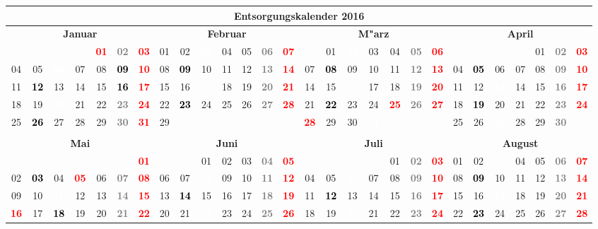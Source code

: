 \documentclass[10pt,a4paper,landscape]{article}
\newcommand{\gb}[1]{\cellcolor{SpringGreen}\textcolor{black}{\bf #1}}
\newcommand{\yb}[1]{\cellcolor{yellow}\textcolor{black}{\bf #1}}
\newcommand{\iv}[1]{\cellcolor{black}\textcolor{white}{\bf #1}}
\newcommand{\rb}[1]{\textbf{\textcolor{red}{#1}}}
\newcommand{\hv}[1]{\textbf{\textcolor{Gray}{#1}}}
\begin{document}
\begin{tabular}{|ccccccc|ccccccc|ccccccc|ccccccc|}
\hline
\multicolumn{28}{|c|}{\textbf{Entsorgungskalender 2016}} \\\hline
\multicolumn{7}{|c|}{\bf Januar} & \multicolumn{7}{|c|}{\bf Februar} & \multicolumn{7}{|c|}{\bf M"arz} & \multicolumn{7}{|c|}{\bf April} \\
& & & & \rb{01} & \hv{02} & \rb{03} & 01 & 02 & \iv{03} & 04 & 05 & \hv{06} & \rb{07} & & 01 & \iv{02} & 03 & 04 & \hv{05} & \rb{06} &  &  &  &  & 01 & \hv{02} & \rb{03} \\
04 & 05 & \iv{06} & 07 & 08 & \gb{09} & \rb{10} & 08 & \yb{09} & 10 & 11 & 12 & \hv{13} & \rb{14} & 07 & \yb{08} & 09 & 10 & 11 & \hv{12} & \rb{13} & 04 & \yb{05} & 06 & 07 & 08 & \hv{09} & \rb{10} \\
11 & \yb{12} & 13 & 14 & 15 & \gb{16} & \rb{17} & 15 & 16 & \iv{17} & 18 & 19 & \hv{20} & \rb{21} & 14 & 15 & \iv{16} & 17 & 18 & \hv{19} & \rb{20} & 11 & 12 & \iv{13} & 14 & 15 & \hv{16} & \rb{17} \\
18 & 19 & \iv{20} & 21 & 22 & \hv{23} & \rb{24} & 22 & \yb{23} & 24 & 25 & 26 & \hv{27} & \rb{28} & 21 & \yb{22} & 23 & 24 & \rb{25} & \hv{26} & \rb{27} & 18 & \yb{19} & 20 & 21 & 22 & \hv{23} & \rb{24} \\
25 & \yb{26} & 27 & 28 & 29 & \hv{30} & \rb{31} & 29 & & & & & & & \rb{28} & 29 & 30 & \iv{31} & & & & 25 & 26 & \iv{27} & 28 & 29 & \hv{30} &  \\
& & & & & & & & & & & & & & & & & & & & &  &  &  &  &  &  &  \\
\hline
\multicolumn{7}{|c|}{\bf Mai} & \multicolumn{7}{|c|}{\bf Juni} & \multicolumn{7}{|c|}{\bf Juli} & \multicolumn{7}{|c|}{\bf August} \\
& & & & & & \rb{01} & & & 01 & 02 & 03 & \hv{04} & \rb{05} & & & & & 01 & \hv{02} & \rb{03} & 01 & 02 & \iv{03} & 04 & 05 & \hv{06} & \rb{07} \\
02 & \yb{03} & 04 & \rb{05} & 06 & \hv{07} & \rb{08} & 06 & 07 & \iv{08} & 09 & 10 & \hv{11} & \rb{12} & 04 & 05 & \iv{06} & 07 & 08 & \hv{09} & \rb{10} & 08 & \yb{09} & 10 & 11 & 12 & \hv{13} & \rb{14} \\
09 & 10 & \iv{11} & 12 & 13 & \hv{14} & \rb{15} & 13 & \yb{14} & 15 & 16 & 17 & \hv{18} & \rb{19} & 11 & \yb{12} & 13 & 14 & 15 & \hv{16} & \rb{17} & 15 & 16 & \iv{17} & 18 & 19 & \hv{20} & \rb{21} \\
\rb{16} & 17 & \yb{18} & 19 & 20 & \hv{21} & \rb{22} & 20 & 21 & \iv{22} & 23 & 24 & \hv{25} & \rb{26} & 18 & 19 & \iv{20} & 21 & 22 & \hv{23} & \rb{24} & 22 & \yb{23} & 24 & 25 & 26 & \hv{27} & \rb{28} \\

\end{tabular}
\end{document}
